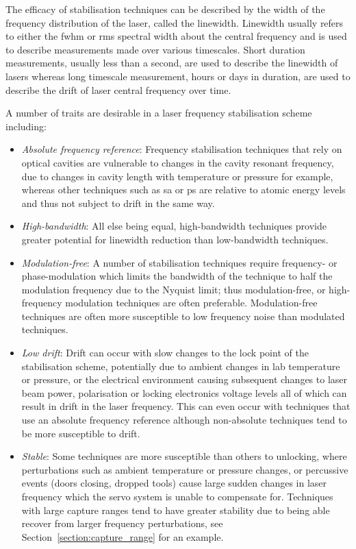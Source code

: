 The efficacy of stabilisation techniques can be described by the width of the frequency distribution of the laser, called the linewidth.
Linewidth usually refers to either the \gls{fwhm} or \gls{rms} spectral width about the central frequency and is used to describe measurements made over various timescales.
Short duration measurements, usually less than a second, are used to describe the linewidth of lasers whereas long timescale measurement, hours or days in duration, are used to describe the drift of laser central frequency over time.

A number of traits are desirable in a laser frequency stabilisation scheme including:
\begin{itemize}
    \item \emph{Absolute frequency reference}: Frequency stabilisation techniques that rely on optical cavities are vulnerable to changes in the cavity resonant frequency, due to changes in cavity length with temperature or pressure for example, whereas other techniques such as \gls{sa} or \gls{ps} are relative to atomic energy levels and thus not subject to drift in the same way.
    \item \emph{High-bandwidth}: All else being equal, high-bandwidth techniques provide greater potential for linewidth reduction than low-bandwidth techniques.
    \item \emph{Modulation-free}: A number of stabilisation techniques require frequency- or phase-modulation which limits the bandwidth of the technique to half the modulation frequency due to the Nyquist limit; thus modulation-free, or high-frequency modulation techniques are often preferable. Modulation-free techniques are often more susceptible to low frequency noise than modulated techniques.
    \item \emph{Low drift}: Drift can occur with slow changes to the lock point of the stabilisation scheme, potentially due to ambient changes in lab temperature or pressure, or the electrical environment causing subsequent changes to laser beam power, polarisation or locking electronics voltage levels all of which can result in drift in the laser frequency. This can even occur with techniques that use an absolute frequency reference although non-absolute techniques tend to be more susceptible to drift.
    \item \emph{Stable}: Some techniques are more susceptible than others to unlocking, where perturbations such as ambient temperature or pressure changes, or percussive events (doors closing, dropped tools) cause large sudden changes in laser frequency which the servo system is unable to compensate for. Techniques with large capture ranges tend to have greater stability due to being able recover from larger frequency perturbations, see Section~\ref{section:capture_range} for an example.
\end{itemize}

